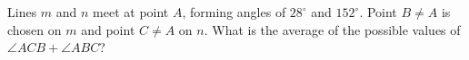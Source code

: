 Lines $m$ and $n$ meet at point $A$, forming angles of $28^\circ$ and $152^\circ$. Point $B\ne A$ is chosen on $m$ and point $C\ne A$ on $n$. What is the average of the possible values of $\angle ACB+\angle ABC$?
